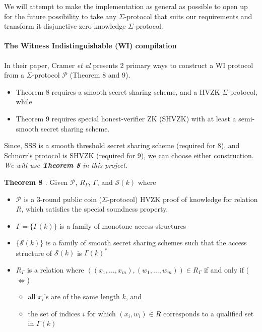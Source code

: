 We will attempt to make the implementation as general as possible to open up for the future possibility to take any $\Sigma$-protocol that suits our requirements and transform it disjunctive zero-knowledge $\Sigma$-protocol.

\paragraph{The Witness Indistinguishable (WI) compilation}

In their paper, Cramer {\em{et al}} \cite{CDS94} presents 2 primary ways to construct a WI protocol from a $\Sigma$-protocol $\mathcal P$ (Theorem 8 and 9). 

\begin{itemize}
    \item Theorem 8 requires a smooth secret sharing scheme, and a HVZK $\Sigma$-protocol, while
    \item Theorem 9 requires special honest-verifier ZK (SHVZK) with at least a semi-smooth secret sharing scheme.
\end{itemize}

Since, SSS is a smooth threshold secret sharing scheme (required for 8), and Schnorr's protocol is SHVZK (required for 9), we can choose either construction. 
\textit{We will use \textbf{Theorem 8} in this project.}

\textbf{Theorem 8 \cite{CDS94}}. Given $\mathcal P$, $R_\Gamma$, $\Gamma$, and $\mathcal S(k)$ where

\begin{itemize}
    \item $\mathcal P$ is a 3-round public coin ($\Sigma$-protocol) HVZK proof of knowledge for relation $R$, which satisfies the special soundness property.
    \item $\Gamma = \{ \Gamma(k) \}$ is a family of monotone access structures
    \item $\{\mathcal S(k)\}$ is a family of smooth secret sharing schemes such that the access structure of $\mathcal S(k)$ is $\Gamma(k)^*$
    \item $R_\Gamma$ is a relation where $((x_1,\ldots,x_m),(w_1,\ldots,w_m)) \in R_\Gamma$ if and only if ($\iff$)
    \begin{itemize}
        \item all $x_i$'s are of the same length $k$, and 
        \item the set of indices $i$ for which $(x_i,w_i) \in R$ corresponds to a qualified set in $\Gamma(k)$
    \end{itemize}
\end{itemize}

